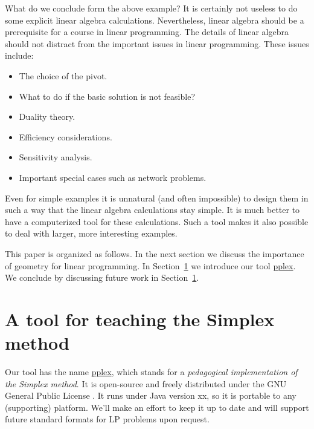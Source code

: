 \documentclass[ukenglish]{nik}
\begin{document}
What do we conclude form the above example? It is certainly not useless to do some explicit
linear algebra calculations. Nevertheless, linear algebra should be a prerequisite for a course
in linear programming. The details of linear algebra should not distract from the important
issues in linear programming. These issues include:
\begin{itemize}
\item The choice of the pivot.
\item What to do if the basic solution is not feasible?
\item Duality theory.
\item Efficiency considerations.
\item Sensitivity analysis.
\item Important special cases such as network problems.
\end{itemize}
Even for simple examples it is unnatural (and often impossible)
to design them in such a way that the linear algebra calculations stay simple.
It is much better to have a computerized tool for these calculations. Such a tool makes
it also possible to deal with larger, more interesting examples. 

This paper is organized as follows. In the next section we discuss the importance of
geometry for linear programming. In Section~\ref{} we introduce our tool \url{pplex}.
We conclude by discussing future work in Section~\ref{}.


\section{A tool for teaching the Simplex method}
Our tool has the name \url{pplex},
which stands for a \emph{pedagogical implementation of the Simplex method}.
It is open-source \cite{pplex} and freely distributed under the 
GNU General Public License \cite{GNUGPL}.
It runs under Java version xx, so it is portable to any (supporting) platform.
We'll make an effort to keep it up to date and will support future standard
formats for LP problems upon request.
\end{document}
